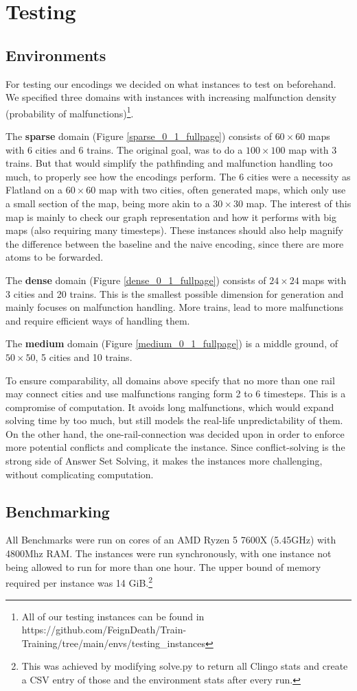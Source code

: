 \section{Testing}
\subsection{Environments}
For testing our encodings we decided on what instances to test on beforehand. We specified three domains with instances with increasing malfunction density (probability of malfunctions)\footnote{All of our testing instances can be found in https://github.com/FeignDeath/Train-Training/tree/main/envs/testing\_instances}. 

The \textbf{sparse} domain (Figure \ref{sparse_0_1_fullpage}) consists of $60\times60$ maps with 6 cities and 6 trains. The original goal, was to do a $100\times100$ map with 3 trains. But that would simplify the pathfinding and malfunction handling too much, to properly see how the encodings perform. The 6 cities were a necessity as Flatland on a $60\times60$ map with two cities, often generated maps, which only use a small section of the map, being more akin to a $30\times30$ map. The interest of this map is mainly to check our graph representation and how it performs with big maps (also requiring many timesteps). 
These instances should also help magnify the difference between the baseline and the naive encoding, since there are more atoms to be forwarded.

The \textbf{dense} domain (Figure \ref{dense_0_1_fullpage}) consists of $24\times24$ maps with 3 cities and 20 trains. This is the smallest possible dimension for generation and mainly focuses on malfunction handling. More trains, lead to more malfunctions and require efficient ways of handling them.

The \textbf{medium} domain (Figure \ref{medium_0_1_fullpage}) is a middle ground, of $50\times50$, 5 cities and 10 trains.

To ensure comparability, all domains above specify that no more than one rail may connect cities and use malfunctions ranging form 2 to 6 timesteps. This is a compromise of computation. It avoids long malfunctions, which would expand solving time by too much, but still models the real-life unpredictability of them. On the other hand, the one-rail-connection was decided upon in order to enforce more potential conflicts and complicate the instance. Since conflict-solving is the strong side of Answer Set Solving, it makes the instances more challenging, without complicating computation.

\subsection{Benchmarking}
All Benchmarks were run on cores of an AMD Ryzen 5 7600X (5.45GHz) with 4800Mhz RAM. The instances were run synchronously, with one instance not being allowed to run for more than one hour. The upper bound of memory required per instance was 14 GiB.\footnote{This was achieved by modifying solve.py to return all Clingo stats and create a CSV entry of those and the environment stats after every run.}